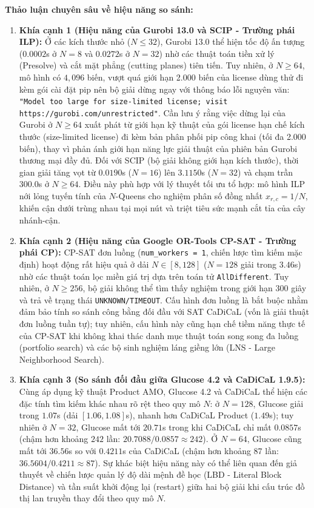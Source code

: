 \documentclass[a4paper,fleqn]{cas-sc}
\begin{document}
\textbf{Thảo luận chuyên sâu về hiệu năng so sánh:}
\begin{enumerate}
    \item \textbf{Khía cạnh 1 (Hiệu năng của Gurobi 13.0 và SCIP - Trường phái ILP):} Ở các kích thước nhỏ ($N \le 32$), Gurobi 13.0 thể hiện tốc độ ấn tượng ($0.0002$s ở $N=8$ và $0.0272$s ở $N=32$) nhờ các thuật toán tiền xử lý (Presolve) và cắt mặt phẳng (cutting planes) tiên tiến. Tuy nhiên, ở $N \ge 64$, mô hình có $4{,}096$ biến, vượt quá giới hạn 2.000 biến của license dùng thử đi kèm gói cài đặt pip nên bộ giải dừng ngay với thông báo lỗi nguyên văn: \texttt{"Model too large for size-limited license; visit https://gurobi.com/unrestricted"}. Cần lưu ý rằng việc dừng lại của Gurobi ở $N \ge 64$ xuất phát từ giới hạn kỹ thuật của gói license hạn chế kích thước (size-limited license) đi kèm bản phân phối pip công khai (tối đa 2.000 biến), thay vì phản ánh giới hạn năng lực giải thuật của phiên bản Gurobi thương mại đầy đủ. Đối với SCIP (bộ giải không giới hạn kích thước), thời gian giải tăng vọt từ $0.0190$s ($N=16$) lên $3.1150$s ($N=32$) và chạm trần $300.0$s ở $N \ge 64$. Điều này phù hợp với lý thuyết tối ưu tổ hợp: mô hình ILP nới lỏng tuyến tính của $N$-Queens cho nghiệm phân số đồng nhất $x_{r,c} = 1/N$, khiến cận dưới trùng nhau tại mọi nút và triệt tiêu sức mạnh cắt tỉa của cây nhánh-cận.
    \item \textbf{Khía cạnh 2 (Hiệu năng của Google OR-Tools CP-SAT - Trường phái CP):} CP-SAT đơn luồng (\texttt{num\_workers = 1}, chiến lược tìm kiếm mặc định) hoạt động rất hiệu quả ở dải $N \in [8, 128]$ ($N=128$ giải trong $3.46$s) nhờ các thuật toán lọc miền giá trị dựa trên toán tử \texttt{AllDifferent}. Tuy nhiên, ở $N \ge 256$, bộ giải không thể tìm thấy nghiệm trong giới hạn 300 giây và trả về trạng thái \texttt{UNKNOWN/TIMEOUT}. Cấu hình đơn luồng là bắt buộc nhằm đảm bảo tính so sánh công bằng đối đầu với SAT CaDiCaL (vốn là giải thuật đơn luồng tuần tự); tuy nhiên, cấu hình này cũng hạn chế tiềm năng thực tế của CP-SAT khi không khai thác danh mục thuật toán song song đa luồng (portfolio search) và các bộ sinh nghiệm láng giềng lớn (LNS - Large Neighborhood Search).
    \item \textbf{Khía cạnh 3 (So sánh đối đầu giữa Glucose 4.2 và CaDiCaL 1.9.5):} Cùng áp dụng kỹ thuật Product AMO, Glucose 4.2 và CaDiCaL thể hiện các đặc tính tìm kiếm khác nhau rõ rệt theo quy mô $N$: ở $N=128$, Glucose giải trong $1.07$s (dải $[1.06, 1.08]$s), nhanh hơn CaDiCaL Product ($1.49$s); tuy nhiên ở $N=32$, Glucose mất tới $20.71$s trong khi CaDiCaL chỉ mất $0.0857$s (chậm hơn khoảng $242$ lần: $20.7088 / 0.0857 \approx 242$). Ở $N=64$, Glucose cũng mất tới $36.56$s so với $0.4211$s của CaDiCaL (chậm hơn khoảng 87 lần: $36.5604 / 0.4211 \approx 87$). Sự khác biệt hiệu năng này có thể liên quan đến giả thuyết về chiến lược quản lý độ dài mệnh đề học (LBD - Literal Block Distance) và tần suất khởi động lại (restart) giữa hai bộ giải khi cấu trúc đồ thị lan truyền thay đổi theo quy mô $N$.

\end{enumerate}
\end{document}
